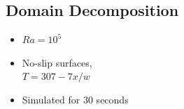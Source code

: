 \documentclass[compress,12pt]{beamer}
\begin{document}
\subsection{Domain Decomposition}
\begin{frame}
    {
      \setlength{\parindent}{0pt}
      \begin{minipage}[h]{.7\textwidth}
	\begin{figure}[h]
	  \centering
	\end{figure}
      \end{minipage}
      \begin{minipage}[h]{.3\textwidth}
	\small
	\raggedright
	\begin{itemize}
	  
 	  \item $Ra=10^5$
	  \item No-slip surfaces,  \\ $T=307-7 x/w$
	  \item Simulated for 30 seconds
	\end{itemize}
	\normalsize	
      \end{minipage}
    }


\end{frame}
\end{document}
